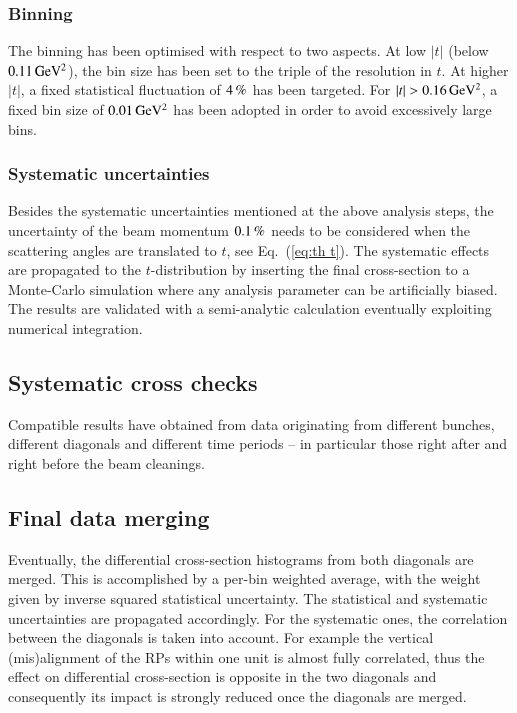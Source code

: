 
\subsubsection{Binning}

The binning has been optimised with respect to two aspects. At low $|t|$ (below $0.11\,{\rm GeV^2}$), the bin size has been set to the triple of the resolution in $t$. At higher $|t|$, a fixed statistical fluctuation of $4\,{\rm \%}$ has been targeted. For $|t| > 0.16\,{\rm GeV^2}$, a fixed bin size of $0.01\,{\rm GeV^2}$ has been adopted in order to avoid excessively large bins.



\subsubsection{Systematic uncertainties}

Besides the systematic uncertainties mentioned at the above analysis steps, the uncertainty of the beam momentum $0.1\,{\rm \%}$ needs to be considered when the scattering angles are translated to $t$, see Eq.~(\ref{eq:th t}). The systematic effects are propagated to the $t$-distribution by inserting the final cross-section to a Monte-Carlo simulation where any analysis parameter can be artificially biased. The results are validated with a semi-analytic calculation eventually exploiting numerical integration.



\subsection{Systematic cross checks}

Compatible results have obtained from data originating from different bunches, different diagonals and different time periods -- in particular those right after and right before the beam cleanings.



\subsection{Final data merging}
\label{sec:final data merging}

Eventually, the differential cross-section histograms from both diagonals are merged. This is accomplished by a per-bin weighted average, with the weight given by inverse squared statistical uncertainty. The statistical and systematic uncertainties are propagated accordingly. For the systematic ones, the correlation between the diagonals is taken into account. For example the vertical (mis)alignment of the RPs within one unit is almost fully correlated, thus the effect on differential cross-section is opposite in the two diagonals and consequently its impact is strongly reduced once the diagonals are merged.

